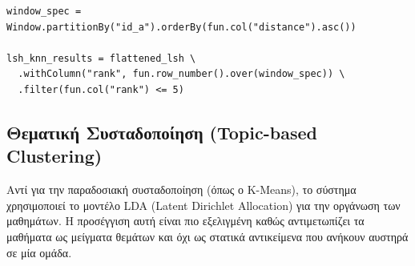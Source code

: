 \documentclass[a4paper,12pt]{article}
\begin{document}
\begin{verbatim}
window_spec = Window.partitionBy("id_a").orderBy(fun.col("distance").asc())

lsh_knn_results = flattened_lsh \
  .withColumn("rank", fun.row_number().over(window_spec)) \
  .filter(fun.col("rank") <= 5)
\end{verbatim}

\subsection{Θεματική Συσταδοποίηση (Topic-based Clustering)} 
Αντί για την παραδοσιακή συσταδοποίηση (όπως ο K-Means), το σύστημα χρησιμοποιεί το μοντέλο LDA (Latent Dirichlet Allocation) για την οργάνωση των μαθημάτων. Η προσέγγιση αυτή είναι πιο εξελιγμένη καθώς αντιμετωπίζει τα μαθήματα ως μείγματα θεμάτων και όχι ως στατικά αντικείμενα που ανήκουν αυστηρά σε μία ομάδα.
\end{document}
